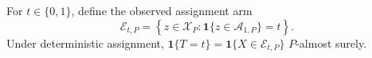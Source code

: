 For \(t\in\{0,1\}\), define the observed assignment arm
\[
 \mathcal E_{t,P}=\left\{z\in\mathcal X_P:
 \mathbf 1\{z\in\mathcal A_{1,P}\}=t\right\}.
\]
Under deterministic assignment,
\(\mathbf 1\{T=t\}=\mathbf 1\{X\in\mathcal E_{t,P}\}\)
\(P\)-almost surely.